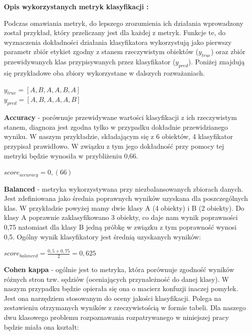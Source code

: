 \documentclass[12pt]{article}
\begin{document}
\centerline{\textbf{Opis wykorzystanych metryk klasyfikacji \cite{bib4}: }}
Podczas omawiania metryk, do lepszego zrozumienia ich działania wprowadzony został przykład, który przeliczany jest dla każdej z metryk. Funkcje te, do wyznaczenia dokładności działania klasyfikatora wykorzystują jako pierwszy parametr zbiór etykiet zgodny z stanem rzeczywistym  obiektów ($y_{true}$) oraz zbiór przewidywanych klas przypisywanych przez klasyfikator ($y_{pred}$). Poniżej znajdują się przykładowe oba zbiory wykorzystane w dalszych rozważaniach. \\
\begin{center}
$ y_{true} = [A, B, A, A, B, A]$ \\
$ y_{pred} = [A, B, A, A, A, B]$ \\
\end{center}
\textbf{Accuracy} - porównuje przewidywane wartości klasyfikacji z ich rzeczywistym stanem, diagnoza jest zgodna tylko w przypadku dokładnie przewidzianego wyniku. W naszym przykładzie, składającym się z 6 obiektów, 4 klasyfikator przypisał prawidłowo. W związku z tym jego dokładność przy pomocy tej metryki będzie wynosiła w przybliżeniu 0,66.
\begin{center}
$ score_{accuracy} = 0,(66) $
\end{center}
\textbf{Balanced} - metryka wykorzystywana przy niezbalansowanych zbiorach danych. Jest zdefiniowana jako średnia poprawnych wyników uzyskana dla poszczególnych klas. W przykładzie powyżej mamy dwie klasy A (4 obiekty) i B (2 obiekty). Do klasy A poprawnie zaklasyfikowano 3  obiekty, co daje nam wynik poprawności 0,75 natomiast dla klasy B jedną próbkę w związku z tym poprawność wynosi 0,5. Ogólny wynik klasyfikatory jest średnią uzyskanych wyników:
\begin{center}
$ score_{balanced} = \frac{0,5+0,75}{2} = 0,625 $
\end{center}
\textbf{Cohen kappa} - ogólnie jest to metryka, która porównuje zgodność wyników różnych stron tzw. sędziów (oceniających przynależność do danej klasy). W naszym przypadku będzie opierała się ona o macierz konfuzji inaczej pomyłek. Jest ona narzędziem stosowanym do oceny jakości klasyfikacji. Polega na zestawieniu otrzymanych wyników z rzeczywistością w formie tabeli. Dla naszego dwu klasowego problemu rozpoznawania rozpatrywanego w niniejszej pracy będzie miała ona kształt:
\end{document}
